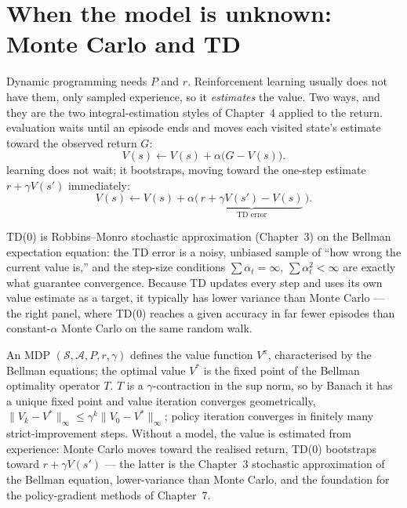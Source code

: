 \documentclass[11pt]{article}
\begin{document}
\section{When the model is unknown: Monte Carlo and TD}

Dynamic programming needs $P$ and $r$. Reinforcement learning usually does not
have them, only sampled experience, so it \emph{estimates} the value. Two ways,
and they are the two integral-estimation styles of Chapter~4 applied to the
return.  evaluation waits until an episode ends and moves
each visited state's estimate toward the observed return $G$:
\[
  V(s) \leftarrow V(s) + \alpha\big(G - V(s)\big).
\]
 learning does not wait; it bootstraps, moving toward
the one-step estimate $r + \gamma V(s')$ immediately:
\[
  V(s) \leftarrow V(s) + \alpha\big(\,\underbrace{r + \gamma V(s') - V(s)}_{\text{TD error}}\,\big).
\]

TD(0) is Robbins--Monro stochastic approximation (Chapter~3) on the Bellman
expectation equation: the TD error is a noisy, unbiased sample of ``how wrong the
current value is,'' and the step-size conditions $\sum\alpha_t=\infty$,
$\sum\alpha_t^2<\infty$ are exactly what guarantee convergence. Because TD updates
every step and uses its own value estimate as a target, it typically has lower
variance than Monte Carlo --- the right panel, where TD(0) reaches a given
accuracy in far fewer episodes than constant-$\alpha$ Monte Carlo on the same
random walk.

\begin{summarybox}
An MDP $(\mathcal{S},\mathcal{A},P,r,\gamma)$ defines the value function
$V^\pi$, characterised by the Bellman equations; the optimal value $V^*$ is the
fixed point of the Bellman optimality operator $T$. $T$ is a $\gamma$-contraction
in the sup norm, so by Banach it has a unique fixed point and value iteration
converges geometrically, $\|V_k-V^*\|_\infty\le\gamma^k\|V_0-V^*\|_\infty$;
policy iteration converges in finitely many strict-improvement steps. Without a
model, the value is estimated from experience: Monte Carlo moves toward the
realised return, TD(0) bootstraps toward $r+\gamma V(s')$ --- the latter is the
Chapter~3 stochastic approximation of the Bellman equation, lower-variance than
Monte Carlo, and the foundation for the policy-gradient methods of Chapter~7.
\end{summarybox}
\end{document}
